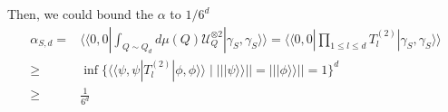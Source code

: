 \documentclass{article}
\newcommand{\supket}[1]{|#1 \rangle\rangle}
\newcommand{\supbra}[1]{\langle\langle #1 |}
\newcommand{\Ucal}{\mathcal{U}}
\begin{document}
Then, we could bound the $\alpha$ to $1/6^d$
\begin{align*}
    \alpha_{S,d} =& \supbra{0,0} \int_{Q\sim Q_d} d\mu(Q)\Ucal_Q^{\otimes 2} \supket{\gamma_S,\gamma_S} = \supbra{0,0} \prod_{1\leq l\leq d} T^{(2)}_l\supket{\gamma_S,\gamma_S} \\
    \geq & \inf\{\supbra{\psi, \psi} T^{(2)}_l \supket{\phi, \phi} \mid ||\supket{\psi}|| = ||\supket{\phi}|| = 1 \}^d \\
    \geq & \frac{1}{6^d}
\end{align*}






\end{document}
